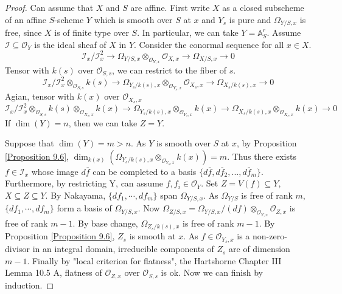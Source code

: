\documentclass{ctexart}
\begin{document}
\begin{proof}
    Can assume that $X$ and $S$ are affine.
    First write $X$ as a closed subscheme of an affine $S$-scheme $Y$ which is smooth over $S$ at $x$ and $Y_{s}$ is pure and $\Omega_{Y/S, x}$ is free, since $X$ is of finite type over $S$.
    In particular, we can take $Y = \mathbb{A}_{S}^{r}$. 
    Assume $\mathcal{I} \subseteq \mathcal{O}_{Y}$ is the ideal sheaf of $X$ in $Y$.
    Consider the conormal sequence for all $x\in X$.
    \begin{equation*}
        \mathcal{I}_{x}/\mathcal{I}_{x}^{2} \longrightarrow \Omega_{Y/S, x} \otimes_{\mathcal{O}_{Y, x}} \mathcal{O}_{X, x} \longrightarrow \Omega_{X/S, x} \longrightarrow 0
    \end{equation*}
    Tensor with $k(s)$ over $\mathcal{O}_{S, s}$, we can restrict to the fiber of $s$.
    \begin{equation*}
        \mathcal{I}_{x}/\mathcal{I}_{x}^{2} \otimes_{\mathcal{O}_{S, s}} k(s) \longrightarrow \Omega_{Y_{s}/k(s), x} \otimes_{\mathcal{O}_{Y_{s}, x}} \mathcal{O}_{X_{s}, x} \longrightarrow \Omega_{X_{s}/k(s), x} \longrightarrow 0
    \end{equation*}
    Agian, tensor with $k(x)$ over $\mathcal{O}_{X_{s}, x}$
    \begin{equation*}
        \mathcal{I}_{x}/\mathcal{I}_{x}^{2} \otimes_{\mathcal{O}_{S, s}} k(s) \otimes_{\mathcal{O}_{X_{s}, x}} k(x) \longrightarrow \Omega_{Y_{s}/k(s), x} \otimes_{\mathcal{O}_{Y_{s}, x}} k(x) \longrightarrow \Omega_{X_{s}/k(s), x} \otimes_{\mathcal{O}_{X_{s}, x}} k(x) \longrightarrow 0
    \end{equation*}
    If $\dim(Y) = n$, then we can take $Z = Y$.
    \par
    Suppose that $\dim(Y) = m > n$.
    As $Y$ is smooth over $S$ at $x$, by Proposition \ref{Proposition 9.6}, $\dim_{k(x)}(\Omega_{Y_{s}/k(s), x} \otimes_{\mathcal{O}_{Y_{s}, x}} k(x)) = m$.
    Thus there exists $f\in \mathcal{I}_{x}$ whose image $d\overline{f}$ can be completed to a basis $\{d\overline{f}, d\overline{f}_{2}, ..., d\overline{f}_{m}\}$.
    Furthermore, by restricting Y, can assume $f, f_{i}\in \mathcal{O}_{Y}$.
    Set $Z = V(f) \subseteq Y$, $X \subseteq Z \subseteq Y$.
    By Nakayama, $\{df_{1}, \cdots, df_{m}\}$ span $\Omega_{Y/S, x}$.
    As $\Omega_{Y/S}$ is free of rank $m$, $\{df_{1}, \cdots, df_{m}\}$ form a basis of $\Omega_{Y/S, x}$.
    Now $\Omega_{Z/S, x} = \Omega_{Y/S, x}/(df) \otimes_{\mathcal{O}_{Y, x}} \mathcal{O}_{Z, x}$ is free of rank $m - 1$.
    By base change, $\Omega_{Z_{s}/k(s), x}$ is free of rank $m - 1$.
    By Proposition \ref{Proposition 9.6}, $Z_{s}$ is smooth at $x$.
    As $f\in \mathcal{O}_{Y_{s}, x}$ is a non-zero-divisor in an integral domain, irreducible components of $Z_{s}$ are of dimension $m - 1$.
    Finally by "local criterion for flatness", the Hartshorne Chapter III Lemma 10.5 A, flatness of $\mathcal{O}_{Z, x}$ over $\mathcal{O}_{S, s}$ is ok.
    Now we can finish by induction.
\end{proof}
\end{document}
